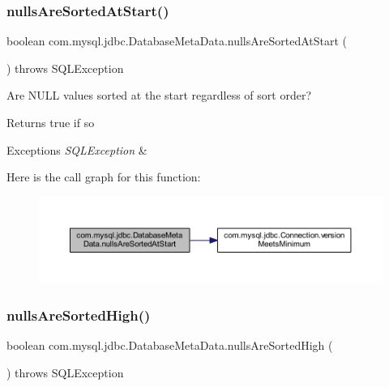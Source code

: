 \subsubsection{\texorpdfstring{nulls\+Are\+Sorted\+At\+Start()}{nullsAreSortedAtStart()}}
{\footnotesize\ttfamily boolean com.\+mysql.\+jdbc.\+Database\+Meta\+Data.\+nulls\+Are\+Sorted\+At\+Start (\begin{DoxyParamCaption}{ }\end{DoxyParamCaption}) throws S\+Q\+L\+Exception}

Are N\+U\+LL values sorted at the start regardless of sort order?

\begin{DoxyReturn}{Returns}
true if so 
\end{DoxyReturn}

\begin{DoxyExceptions}{Exceptions}
{\em S\+Q\+L\+Exception} & \\
\hline
\end{DoxyExceptions}
Here is the call graph for this function\+:
\nopagebreak
\begin{figure}[H]
\begin{center}
\leavevmode
\includegraphics[width=350pt]{classcom_1_1mysql_1_1jdbc_1_1_database_meta_data_ac403aa347ab2be7ba999b33b7d307151_cgraph}
\end{center}
\end{figure}
\mbox{\label{classcom_1_1mysql_1_1jdbc_1_1_database_meta_data_ada8162ea7997c43c5cf2907eceac2142}} 
\subsubsection{\texorpdfstring{nulls\+Are\+Sorted\+High()}{nullsAreSortedHigh()}}
{\footnotesize\ttfamily boolean com.\+mysql.\+jdbc.\+Database\+Meta\+Data.\+nulls\+Are\+Sorted\+High (\begin{DoxyParamCaption}{ }\end{DoxyParamCaption}) throws S\+Q\+L\+Exception}

